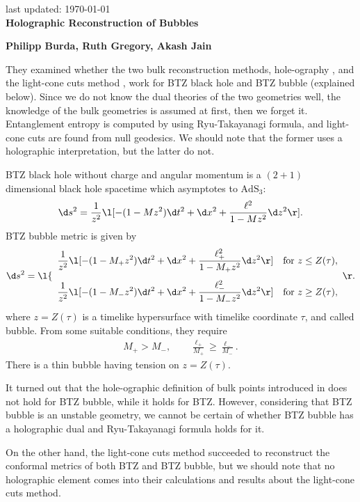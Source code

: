 \documentclass[12pt]{article}
\date{}
\renewcommand{\thefootnote}{\fnsymbol{footnote}}
\begin{document}
{\Large{}
\hfill{\normalsize last updated: \today}
\\[2mm]
\textbf{Holographic Reconstruction of Bubbles\cite{Burda:2018rpb}
}
}

\noindent
\hfill
\textbf{Philipp Burda, Ruth Gregory, Akash Jain}%

\renewcommand{\thefootnote}{\arabic{footnote})}
\setcounter{footnote}{0}
\vspace{12pt}
They examined whether the two bulk reconstruction methods, hole-ography
\cite{Balasubramanian:2013lsa,Czech:2014ppa}, and the light-cone cuts method \cite{Engelhardt:2016wgb}, 
work for BTZ black hole and BTZ bubble (explained below).
Since we do not know the dual theories of the two geometries well,
the knowledge of the bulk geometries is assumed at first, then we forget it.
Entanglement entropy is computed by using Ryu-Takayanagi formula, and light-cone cuts are found from null geodesics.
We should note that the former uses a holographic interpretation, but the latter do not.

BTZ black hole without charge and angular momentum is a $(2+1)$ dimensional black hole spacetime which asymptotes to $\mathrm{AdS}_3$:
\begin{align}
	\d s^2 = \frac{1}{z^2}\l[-(1-Mz^2)\d t^2 + \d x^2 + \frac{\ell^2}{1-Mz^2}\d z^2\r].
\end{align}
BTZ bubble metric is given by
\begin{align}
	\d s^2 = 
	\l\{
		\begin{array}{cc}
			\displaystyle \frac{1}{z^2}\l[-(1-M_+z^2)\d t^2 + \d x^2 + \frac{\ell_+^2}{1-M_+z^2}\d z^2\r] & \mathrm{for}~z\le Z(\tau),\\[5mm]
			\displaystyle\frac{1}{z^2}\l[-(1-M_-z^2)\d t^2 + \d x^2 + \frac{\ell_-^2}{1-M_-z^2}\d z^2\r] & \mathrm{for}~z\ge Z(\tau),
		\end{array}
	\r.
\end{align}
where $z = Z(\tau)$ is  a timelike hypersurface with timelike coordinate $\tau$, and called bubble.
From some suitable conditions, they require
\begin{align}
	M_+ > M_-,\qquad \frac{\ell_+}{M_+} \geq \frac{\ell_-}{M_-}.
\end{align}
There is a thin bubble having tension on $z = Z(\tau)$.

It turned out that the hole-ographic definition of bulk points introduced in \cite{Czech:2014ppa} does not hold for BTZ bubble, while it holds for BTZ.
However, considering that BTZ bubble is an unstable geometry, we cannot be certain of whether
BTZ bubble has a holographic dual and Ryu-Takayanagi formula holds for it.

On the other hand, the light-cone cuts method succeeded to reconstruct the conformal metrics of both BTZ and BTZ bubble,
but we should note that no holographic element comes into their calculations and results about the light-cone cuts method.




 

\end{document}
